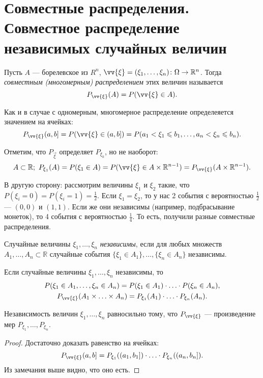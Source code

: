 \section{Совместные распределения. Совместное распределение независимых случайных величин}

\begin{definition}
    Пусть $A$ --- борелевское из $R^n$, 
     $\vv{\xi} = (\xi_1, \ldots, \xi_n) \colon \Omega \rightarrow \mathbb{R}^n$. Тогда \textit{совместным (многомерным) распределением} этих величин называется 
     $$P_{\vv{\xi}}(A) = P(\vv{\xi} \in A).$$
 \end{definition}

Как и в случае с одномерным, многомерное распределение определеяется значением на ячейках:
     $$P_{\vv{\xi}}(a, b] = P(\vv{\xi} \in (a, b]) = P(a_1 < \xi_1 \le b_1, \ldots, a_n < \xi_n \le b_n).$$


     Отметим, что $P_{\overset{\rightarrow}{\xi}}$ определяет $P_{\xi_k}$, но не наоборот:
     $$A\subset\mathbb{R}; \  P_{\xi_1}(A) = P(\xi_1\in A) = P(\vv{\xi}\in A\times\mathbb{R}^{n - 1}) = P_{\vv{\xi}} (A\times\mathbb{R}^{n - 1}).$$


В другую сторону: рассмотрим величины $\xi_1$ и $\xi_2$ такие, что $P(\xi_i = 0) = P(\xi_i = 1) = \frac{1}{2}$.
     Если $\xi_1 = \xi_2$, то у нас 2 события с вероятностью $\frac{1}{2}$ ---  $(0, 0)$ и $(1, 1)$.
     Если же они независимы (например, подбрасывание монеток), то 4 события с вероятностью $\frac{1}{4}$.
     То есть, получили разные совместные распределения.


 \begin{definition}
     Случайные величины $\xi_1, \ldots, \xi_n$ \textit{независимы}, если 
     для любых множеств $A_1, \ldots, A_n \subset \mathbb{R}$ случайные события
     $\{\xi_1\in A_1\}, \ldots, \{\xi_n \in A_n\}$ независимы.
 \end{definition}

\begin{remark}
    Если случайные величины $\xi_1, \ldots, \xi_n$ независимы, то
    \begin{gather*}
        P(\xi_1\in A_1, \ldots, \xi_n\in A_n) = P(\xi_1\in A_1)\cdot\ldots\cdot P(\xi_n\in A_n), \\
        P_{\vv{\xi}}(A_1\times\ldots\times A_n) = P_{\xi_1}(A_1)\cdot\ldots\cdot P_{\xi_n} (A_n).
    \end{gather*}
\end{remark}
    


 \begin{theorem}
     Независимость величин $\xi_1, \ldots, \xi_n$ равносильно тому, что $P_{\vv{\xi}}$ --- произведение мер $P_{\xi_1}, \ldots, P_{\xi_n}$.
 \end{theorem}

 \begin{proof}
     Достаточно доказать равенство на ячейках:
     $$P_{\vv{\xi}}(a, b] = P_{\xi_1}((a_1, b_1])\cdot\ldots\cdot P_{\xi_n}((a_n, b_n]).$$
     Из замечания выше видно, что оно есть.
 \end{proof}\newpage
